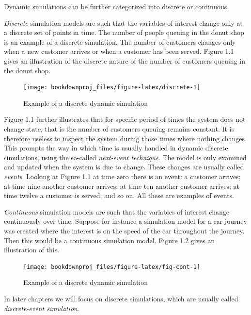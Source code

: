 \documentclass[
]{book}
\begin{document}
Dynamic simulations can be further categorized into discrete or continuous.

\emph{Discrete} simulation models are such that the variables of interest change only at a discrete set of points in time. The number of people queuing in the donut shop is an example of a discrete simulation. The number of customers changes only when a new customer arrives or when a customer has been served. Figure 1.1 gives an illustration of the discrete nature of the number of customers queuing in the donut shop.

\begin{figure}

{\centering \texttt{[image: bookdownproj\_files/figure-latex/discrete-1]} 

}

\caption{Example of a discrete dynamic simulation}\label{fig:discrete}
\end{figure}

Figure 1.1 further illustrates that for specific period of times the system does not change state, that is the number of customers queuing remains constant. It is therefore useless to inspect the system during those times where nothing changes. This prompts the way in which time is usually handled in dynamic discrete simulations, using the so-called \emph{next-event technique}. The model is only examined and updated when the system is due to change. These changes are usually called \emph{events}. Looking at Figure 1.1 at time zero there is an event: a customer arrives; at time nine another customer arrives; at time ten another customer arrives; at time twelve a customer is served; and so on. All these are examples of events.

\emph{Continuous} simulation models are such that the variables of interest change continuously over time. Suppose for instance a simulation model for a car journey was created where the interest is on the speed of the car throughout the journey. Then this would be a continuous simulation model. Figure 1.2 gives an illustration of this.

\begin{figure}

{\centering \texttt{[image: bookdownproj\_files/figure-latex/fig-cont-1]} 

}

\caption{Example of a discrete dynamic simulation}\label{fig:fig-cont}
\end{figure}

In later chapters we will focus on discrete simulations, which are usually called \emph{discrete-event simulation}.
\end{document}
